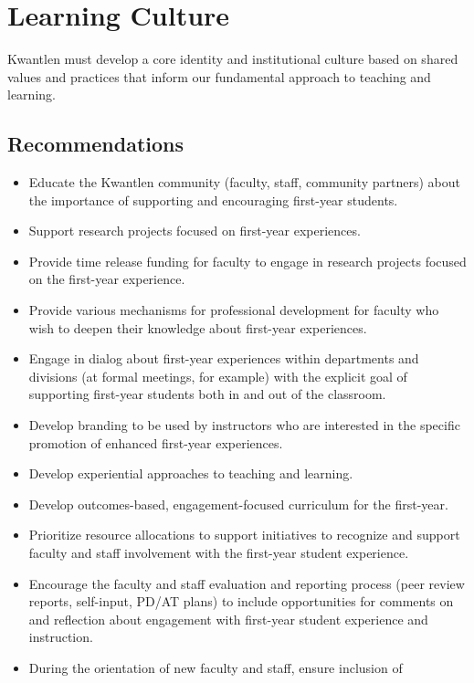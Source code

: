 \documentclass[11pt, letterpaper]{article}
\begin{document}
\section{Learning Culture}
Kwantlen must develop a core identity and institutional culture based on
shared values and practices that inform our fundamental approach to
teaching and learning.

\subsection{Recommendations}

\begin{itemize}

\item
  Educate the Kwantlen community (faculty, staff, community partners)
  about the importance of supporting and encouraging first-year
  students.
\item
  Support research projects focused on first-year experiences.
\item
  Provide time release funding for faculty to engage in research
  projects focused on the first-year experience.
\item
  Provide various mechanisms for professional development for faculty
  who wish to deepen their knowledge about first-year experiences.
\item
  Engage in dialog about first-year experiences within departments and
  divisions (at formal meetings, for example) with the explicit goal of
  supporting first-year students both in and out of the classroom.
\item
  Develop branding to be used by instructors who are interested in the
  specific promotion of enhanced first-year experiences.
\item
  Develop experiential approaches to teaching and learning.
\item
  Develop outcomes-based, engagement-focused curriculum for the
  first-year.
\item
  Prioritize resource allocations to support initiatives to recognize
  and support faculty and staff involvement with the first-year student
  experience.
\item
  Encourage the faculty and staff evaluation and reporting process (peer
  review reports, self-input, PD/AT plans) to include opportunities for
  comments on and reflection about engagement with first-year student
  experience and instruction.
\item
  During the orientation of new faculty and staff, ensure inclusion of

\end{itemize}
\end{document}
